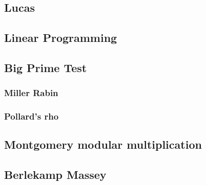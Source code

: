 \subsection{Lucas}


\subsection{Linear Programming}


\subsection{Big Prime Test}

\subsubsection{Miller Rabin}

\subsubsection{Pollard's rho}


\subsection{Montgomery modular multiplication}


\subsection{Berlekamp Massey}

